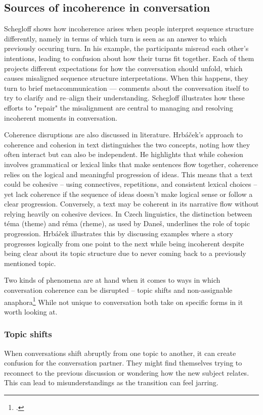 \documentclass[12pt]{report}
\begin{document}
{\subsection{Sources of incoherence in conversation}
\par
Schegloff shows how incoherence arises when
people interpret sequence structure differently,
namely in terms of which turn is seen as an answer to which previously occuring turn.
In his example, the participants misread each other’s intentions,
leading to confusion about how their turns fit together.
Each of them projects different expectations for how the conversation should unfold,
which causes misaligned sequence structure interpretations.
When this happens,
they turn to brief metacommunication — comments about the conversation itself
to try to clarify and re–align their understanding.
Schegloff illustrates how these
efforts to "repair" the misalignment are central to
managing and resolving incoherent moments in conversation.

\par
Coherence disruptions are also discussed in literature.
Hrbáček’s approach to coherence and cohesion in text distinguishes the two concepts,
noting how they often interact but can also be independent.
He highlights that while
cohesion involves grammatical or lexical links that
make sentences flow together,
coherence relies on the logical and meaningful progression of ideas.
This means that a text could be cohesive –
using connectives, repetitions, and consistent lexical choices –
yet lack coherence if the sequence of ideas doesn’t
make logical sense or follow a clear progression.
Conversely, a text may be coherent in its narrative flow without
relying heavily on cohesive devices.
In Czech linguistics,
the distinction between téma (theme) and réma (rheme), as used by Daneš,
underlines the role of topic progression.
Hrbáček illustrates this by discussing examples where
a story progresses logically from one point to the next while
being incoherent despite being clear about its topic structure
due to never coming back to a previously mentioned topic.

\par
Two kinds of phenomena are at hand when it comes to
ways in which conversation coherence can be disrupted –
topic shifts and non-assignable anaphora\footcite{bublitz1999disturbed}
While not unique to conversation
both take on specific forms in it worth looking at.

\subsubsection{Topic shifts}
\par
    When conversations shift abruptly from one topic to another,
    it can create confusion for the conversation partner.
    They might find themselves trying to
    reconnect to the previous discussion or
    wondering how the new subject relates.
    This can lead to misunderstandings
    as the transition can feel jarring.

}
\end{document}
